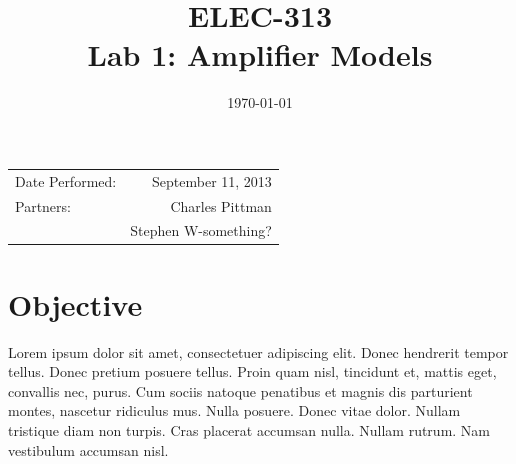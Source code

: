 \documentclass{article}
\author{}
\title{ELEC-313 \\ Lab 1: Amplifier Models \\ }
\date{\today}
\begin{document}
\maketitle %

 \begin{center}
   \begin{tabular}{lr}
    Date Performed: & September 11, 2013 \\
    Partners: & Charles Pittman \\
              & Stephen W-something? \\
  \end{tabular}
\end{center}

\pagebreak



\renewcommand{\labelenumi}{\alph{enumi}.}

\section{Objective}

\label{sec:objective}

Lorem ipsum dolor sit amet, consectetuer adipiscing elit. Donec
hendrerit tempor tellus. Donec pretium posuere tellus. Proin quam
nisl, tincidunt et, mattis eget, convallis nec, purus. Cum sociis
natoque penatibus et magnis dis parturient montes, nascetur ridiculus
mus. Nulla posuere. Donec vitae dolor. Nullam tristique diam non
turpis. Cras placerat accumsan nulla. Nullam rutrum. Nam vestibulum
accumsan nisl.

\end{document}
